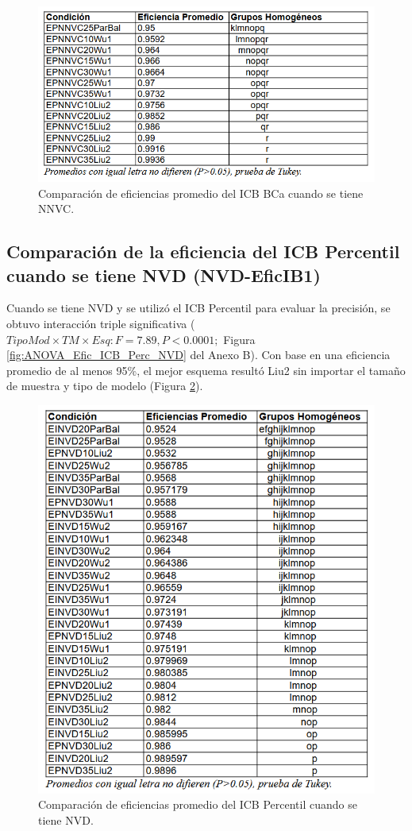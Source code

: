 \begin{figure}[ht] 
	\centering 
	\includegraphics[width=0.76\linewidth]{img/CompEfic_PromICB_BCa_NNVC.png} 
	\caption{Comparación de eficiencias promedio del ICB BCa cuando se tiene NNVC.} 
	\label{fig:CompEfic_PromICB_BCa_NNVC}
\end{figure}
\FloatBarrier




\subsection{Comparación de la eficiencia del ICB Percentil cuando se tiene NVD (NVD-EficIB1)}

Cuando se tiene NVD y se utilizó el ICB Percentil para evaluar la precisión, se obtuvo interacción triple significativa ($TipoMod \times TM \times Esq: F=7.89, P<0.0001;$ Figura \ref{fig:ANOVA_Efic_ICB_Perc_NVD} del Anexo B). Con base en una eficiencia promedio de al menos 95\%, el mejor esquema resultó Liu2 sin importar el tamaño de muestra y tipo de modelo (Figura \ref{fig:CompEfic_PromICB_Perc_NVD}).\\


\begin{figure}[ht] 
	\centering 
	\includegraphics[width=0.76\linewidth]{img/CompEfic_PromICB_Perc_NVD.png} 
	\caption{Comparación de eficiencias promedio del ICB Percentil cuando se tiene NVD.} 
	\label{fig:CompEfic_PromICB_Perc_NVD}
\end{figure}
\FloatBarrier



